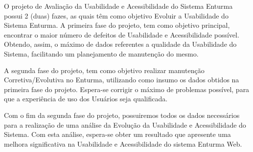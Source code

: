 
	O projeto de Avaliação da Usabilidade e Acessibilidade do Sistema Enturma possui 2 (duas) fazes, as quais têm como objetivo Evoluir a Usabilidade do Sistema Enturma. A primeira fase do projeto, tem como objetivo principal, encontrar o maior número de defeitos de Usabilidade e Acessibilidade possível. Obtendo, assim, o máximo de dados referentes a qualidade da Usabilidade do Sistema, facilitando um planejamento de manutenção do mesmo.

	A segunda fase do projeto, tem como objetivo realizar manutenção Corretiva/Evolutiva no Enturma, utilizando como insumo os dados obtidos na primeira fase do projeto. Espera-se corrigir o máximo de problemas possível, para que a experiência de uso dos Usuários seja qualificada.

	Com o fim da segunda fase do projeto, possuiremos todos os dados necessários para a realização de uma análise da Evolução da Usabilidade e Acessibilidade do Sistema. Com esta análise, espera-se obter um resultado que apresente uma melhora significativa na Usabilidade e Acessibilidade do sistema Enturma Web.